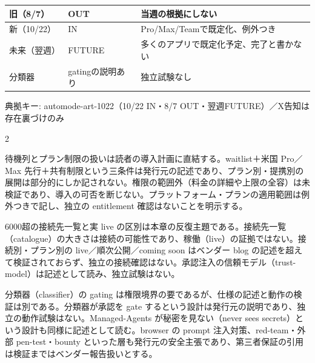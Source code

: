 \documentclass[lualatex,a4paper,10pt]{jlreq}
\begin{document}
{\centering\footnotesize
{}
\begin{tabularx}{0.96\linewidth}{@{}lXX@{}}
\toprule
旧（8/7） & OUT & 当週の根拠にしない \\
\midrule
新（10/22） & IN & Pro/Max/Teamで既定化、例外つき \\
未来（翌週） & FUTURE & 多くのアプリで既定化予定、完了と書かない \\
分類器 & gatingの説明あり & 独立試験なし \\
\bottomrule
\end{tabularx}
{\scriptsize\color{SurveyMuted} 典拠キー: automode-art-1022（10/22 IN・8/7 OUT・翌週FUTURE）／X告知は存在裏づけのみ\par}
} %
\begin{multicols}{2} %


待機列とプラン制限の扱いは読者の導入計画に直結する。waitlist＋米国 Pro／Max 先行＋共有制限という三条件は発行元の記述であり、プラン別・提携別の展開は部分的にしか記されない。権限の範囲外（料金の詳細や上限の全容）は未検証であり、導入の可否を断じない。プラットフォーム・プランの適用範囲は例外つきで記し、独立の entitlement 確認はないことを明示する。


6000超の接続先一覧と実 live の区別は本章の反復主題である。接続先一覧（catalogue）の大きさは接続の可能性であり、稼働（live）の証拠ではない。接続別・プラン別の live／順次公開／coming soon はベンダー blog の記述を超えて検証されておらず、独立の接続確認はない。承認注入の信頼モデル（trust-model）は記述として読み、独立試験はない。


分類器（classifier）の gating は権限境界の要であるが、仕様の記述と動作の検証は別である。分類器が承認を gate するという設計は発行元の説明であり、独立の動作試験はない。Managed-Agents が秘密を見ない（never sees secrets）という設計も同様に記述として読む。browser の prompt 注入対策、red-team・外部 pen-test・bounty といった層も発行元の安全主張であり、第三者保証の引用は検証まではベンダー報告扱いとする。


\end{multicols} %
\end{document}
